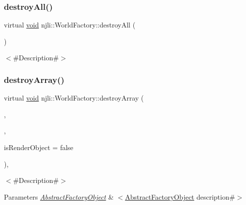 \subsubsection{\texorpdfstring{destroy\+All()}{destroyAll()}}
{\footnotesize\ttfamily virtual \mbox{\hyperlink{_thread_8h_af1e856da2e658414cb2456cb6f7ebc66}{void}} njli\+::\+World\+Factory\+::destroy\+All (\begin{DoxyParamCaption}{ }\end{DoxyParamCaption})\hspace{0.3cm}{\ttfamily [virtual]}}

$<$\#\+Description\#$>$ \mbox{\label{classnjli_1_1_world_factory_a2a3ae9f5b93cd70b470de9ed3e1edb05}} 
\subsubsection{\texorpdfstring{destroy\+Array()}{destroyArray()}}
{\footnotesize\ttfamily virtual \mbox{\hyperlink{_thread_8h_af1e856da2e658414cb2456cb6f7ebc66}{void}} njli\+::\+World\+Factory\+::destroy\+Array (\begin{DoxyParamCaption}\item[{\mbox{\hyperlink{classnjli_1_1_abstract_factory_object}{Abstract\+Factory\+Object}} $\ast$$\ast$}]{,  }\item[{const \mbox{\hyperlink{_util_8h_a10e94b422ef0c20dcdec20d31a1f5049}{u32}}}]{,  }\item[{bool}]{is\+Render\+Object = {\ttfamily false} }\end{DoxyParamCaption})\hspace{0.3cm}{\ttfamily [protected]}, {\ttfamily [virtual]}}

$<$\#\+Description\#$>$


\begin{DoxyParams}{Parameters}
{\em \mbox{\hyperlink{classnjli_1_1_abstract_factory_object}{Abstract\+Factory\+Object}}} & $<$\mbox{\hyperlink{classnjli_1_1_world_factory_a59f5fcb165066624f68fb5417aa3586e}{Abstract\+Factory\+Object}} description\#$>$ \\
\hline
\end{DoxyParams}
\mbox{\label{classnjli_1_1_world_factory_a8f9aeb468fce2ee2c0c4adf50824db1a}} 
